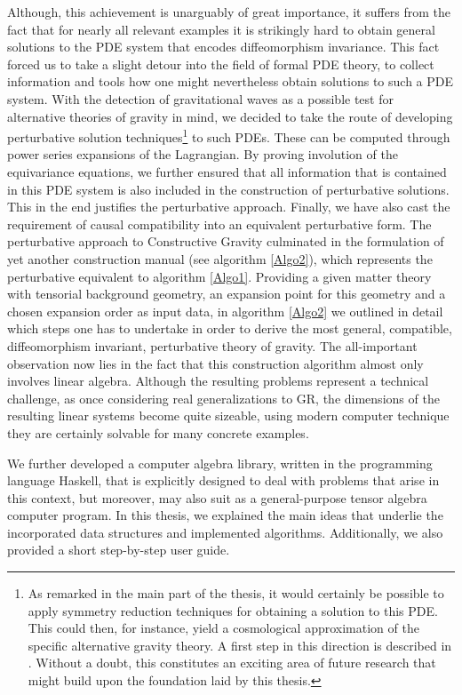 Although, this achievement is unarguably of great importance, it suffers from the fact that for nearly all relevant examples it is strikingly hard to obtain general solutions to the 
PDE system that encodes diffeomorphism invariance. 
This fact forced us to take a slight detour into the field of formal PDE theory, to collect information and tools how one might nevertheless obtain solutions to such a PDE system. 
With the detection of gravitational waves as a possible test for alternative theories of gravity in mind, we decided to take the route of developing perturbative solution techniques\footnote{As remarked in the main part of the thesis, it would certainly be possible to apply symmetry reduction techniques for obtaining a solution to this PDE. This could then, for instance, yield a cosmological approximation of the specific alternative gravity theory. A first step in this direction is described in \cite{ToBePublished}. Without a doubt, this constitutes an exciting area of future research that might build upon the foundation laid by this thesis.} to such PDEs. These can be computed through power series expansions of the Lagrangian. By proving involution of the equivariance equations, we further ensured that all information that is contained in this PDE system is also included in the construction of perturbative solutions. This in the end justifies the perturbative approach. 
Finally, we have also cast the requirement of causal compatibility into an equivalent perturbative form. The perturbative approach to Constructive Gravity culminated in the formulation of yet another construction manual (see algorithm \ref{Algo2}), which represents the perturbative equivalent to algorithm \ref{Algo1}. Providing a given matter theory with tensorial background geometry, an expansion point for this geometry and a chosen expansion order as input data, in algorithm \ref{Algo2} we outlined in detail which steps one has to undertake in order to derive the most general, compatible, diffeomorphism invariant, perturbative theory of gravity. The all-important observation now lies in the fact that this construction algorithm almost only involves linear algebra. Although the resulting problems represent a technical challenge, as once considering real generalizations to GR, the dimensions of the resulting linear systems become quite sizeable, using modern computer technique they are certainly solvable for many concrete examples. 

We further developed a computer algebra library, written in the programming language Haskell, that is explicitly designed to deal with problems that arise in this context, but moreover, may also suit as a general-purpose tensor algebra computer program. 
In this thesis, we explained the main ideas that underlie the incorporated data structures and implemented algorithms. Additionally, we also provided a short step-by-step user guide. 


